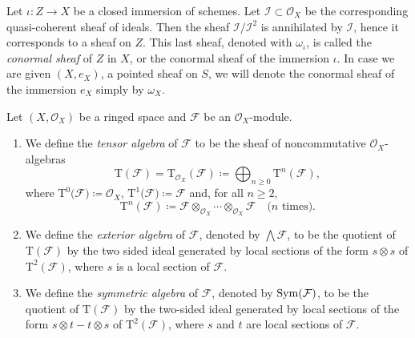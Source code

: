 \begin{defn}
	Let $\iota\colon Z \to X$ be a closed immersion of schemes.
	Let $\mathcal{I} \subset \mathcal{O}_X$ be the corresponding
	quasi-coherent sheaf of ideals.
	Then the sheaf $\mathcal{I}/\mathcal{I}^2$ is annihilated by $\mathcal{I}$,
	hence it corresponds to a sheaf on $Z$.
	This last sheaf, denoted with $\omega_{ \iota }$, is called the \emph{conormal
	sheaf} of $Z$ in $X$, or the conormal sheaf of the immersion $\iota$.
	In case we are given $\left(X, e_X\right)$, a pointed sheaf on $S$, we will denote 
	the conormal sheaf of the immersion $e_X$ simply by $\omega_X$.
\end{defn}


\begin{defn}
	Let $( X , \mathcal{O}_{ X } )$ be a ringed space and $\mathcal{F}$ be an
	$\mathcal{O}_{ X }$-module.
\begin{enumerate}
	\item We define the \emph{tensor algebra} of $\mathcal{F}$ to be the sheaf of
		noncommutative $\mathcal{O}_{ X }$-algebras
		\begin{equation*}
			\mathrm{T}(\mathcal{F}) = 
			\mathrm{T}_{\mathcal{O}_{ X }}(\mathcal{F}) \coloneqq
			\bigoplus_{n \geq 0} \mathrm{T}^n(\mathcal{F})
		,\end{equation*}
		where $\mathrm{T}^0(\mathcal{F)} \coloneqq \mathcal{O}_{ X }$,
		$\mathrm{T}^1(\mathcal{F)} \coloneqq \mathcal{F}$ and,
		for all $n \geq 2$,
		\begin{equation*}
			\mathrm{T}^n(\mathcal{F}) \coloneqq 
			\mathcal{F} \otimes_{\mathcal{O}_{ X }} \cdots \otimes_{\mathcal{O}_{ X }}
			\mathcal{F}
			\quad \text{($n$ times)}
		.\end{equation*}
	
	\item We define the \emph{exterior algebra} of $\mathcal{F}$, 
		denoted by $\bigwedge \mathcal{F}$, to be the quotient of
		$\mathrm{T}(\mathcal{F})$ by the two sided ideal
		generated by local sections of the form
		$s \otimes s$ of $\mathrm{T}^2(\mathcal{F})$,
		where $s$ is a local section of $\mathcal{F}$.

	\item We define the \emph{symmetric algebra} of $\mathcal{F}$,
		denoted by $\operatorname{Sym}(\mathcal{F})$, to be the quotient 
		of $\mathrm{T}(\mathcal{F})$ by the two-sided ideal
		generated by local sections of the form
		$s \otimes t - t \otimes s$ of $\mathrm{T}^2(\mathcal{F})$,
		where $s$ and $t$ are local sections of $\mathcal{F}$.
\end{enumerate}
\end{defn}


